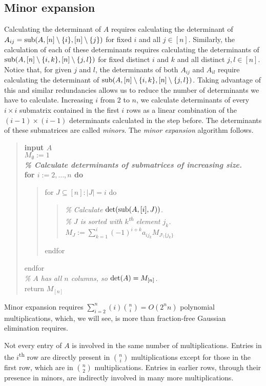 \documentclass[12pt]{amsart}
\numberwithin{equation}{section}
\numberwithin{figure}{section}
\newcommand{\xth}{\textsuperscript{th}\xspace}
\newcommand{\lrparen}[2][1]{\ifthenelse{\equal{#1}{1}}{(#2)}{\left(#2\right)}}
\DeclareMathOperator{\subop}{sub}
\newcommand{\sub}[4][1]{\subop\lrparen[#1]{#2, #3, #4}}
\DeclareMathOperator{\detop}{det}
\renewcommand{\det}[2][1]{\detop\lrparen[#1]{#2}}
\newcommand{\smin}{\setminus}
\begin{document}
\subsection{Minor expansion}\label{minExpIntro}
Calculating the determinant of $A$ requires calculating the determinant of $A_{ij} = \sub{A}{[n]\smin\{i\}}{[n]\smin\{j\}}$ for fixed $i$ and all $j \in [n]$. Similarly, the calculation of each of these determinants requires calculating the determinants of $\sub{A}{[n]\smin\{i,k\}}{[n]\smin\{j,l\}}$ for fixed distinct $i$ and $k$ and all distinct $j,l \in [n]$. Notice that, for given $j$ and $l$, the determinants of both $A_{ij}$ and $A_{il}$ require calculating the determinant of $\sub{A}{[n]\smin\{i,k\}}{[n]\smin\{j,l\}}$. Taking advantage of this and similar redundancies allows us to reduce the number of determinants we have to calculate. Increasing $i$ from 2 to $n$, we calculate determinants of every $i \times i$ submatrix contained in the first $i$ rows as a linear combination of the $(i-1) \times (i-1)$ determinants calculated in the step before. The determinants of these submatrices are called \emph{minors}. The \emph{minor expansion} algorithm follows.

\begin{quote} \bf
input $A$ \\
$M_\emptyset := 1$ \\
\textnormal{\it\% Calculate determinants of submatrices of increasing size.} \\
for $i := 2, \dots, n$ do
\begin{quote}
for $J \subseteq [n] : |J| = i$ do
\begin{quote}
\textnormal{\it\% Calculate $\det{\sub{A}{[i]}{J}}$.} \\
\textnormal{\it\% $J$ is sorted with $k$\xth element $j_k$.} \\
$M_J := \sum_{k=1}^{i}(-1)^{i+k} a_{ij_k} M_{J \smin \{j_k\}}$
\end{quote}
endfor
\end{quote}
endfor \\
\textnormal{\it\% $A$ has all $n$ columns, so $\det{A} = M_{[n]}$.} \\
return $M_{[n]}$
\end{quote}

Minor expansion requires $\sum_{i=2}^{n}(i)\binom{n}{i} = O(2^nn)$ polynomial multiplications, which, we will see, is more than fraction-free Gaussian elimination requires.

Not every entry of $A$ is involved in the same number of multiplications. Entries in the $i$\xth row are directly present in $\binom{n}{i}$ multiplications except for those in the first row, which are in $\binom{n}{2}$ multiplications. Entries in earlier rows, through their presence in minors, are indirectly involved in many more multiplications.
\end{document}
